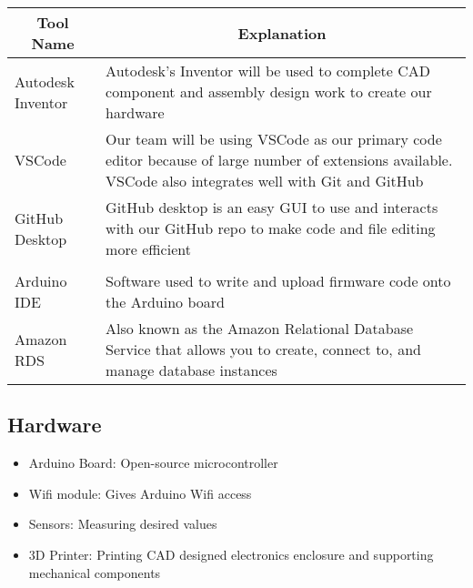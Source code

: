 \documentclass{article}
\begin{document}
\begin{table}[!hbt]
	\centering
	\begin{tabular}{|p{4cm}|p{8cm}|}
	\hline
	\multicolumn{1}{|c|}{\textbf{Tool Name}} & \multicolumn{1}{c|}{\textbf{Explanation}} 
	\\ \hline
	Autodesk Inventor
	&  Autodesk's Inventor will be used to complete CAD component and assembly design work to create our hardware  
	\newline                              
	\\ \hline
	VSCode
	&  Our team will be using VSCode as our primary code editor because of large number of extensions available. VSCode also integrates well with Git and GitHub
	\newline                              
	\\ \hline
	GitHub Desktop
	&  GitHub desktop is an easy GUI to use and interacts with our GitHub repo to make code and file editing more efficient
	\newline                              
	\\ \hline
	\\ \hline
	Arduino IDE
	&  Software used to write and upload firmware code onto the Arduino board
	\newline                     
	\\ \hline
	Amazon RDS
	&  Also known as the Amazon Relational Database Service that allows you to create, connect to, and manage database instances
	\newline                     
	\\ \hline
	\end{tabular}
\end{table}

\subsection{Hardware}
\begin{itemize}
	\item Arduino Board: Open-source microcontroller 
	\item Wifi module: Gives Arduino Wifi access
	\item Sensors: Measuring desired values
	\item 3D Printer: Printing CAD designed electronics enclosure and supporting mechanical components
\end{itemize}
\end{document}
